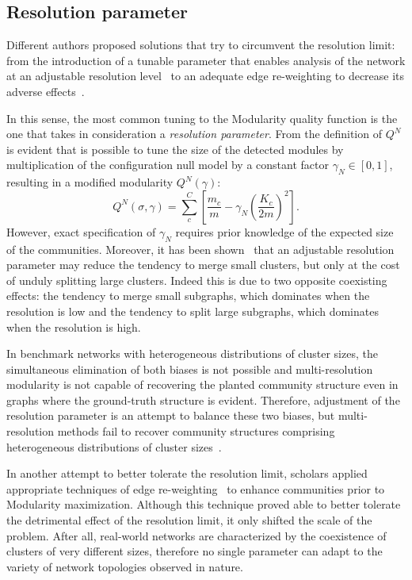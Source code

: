 \subsection{Resolution parameter}\label{sec:resolution_parameter}
Different authors proposed solutions that try to circumvent the resolution limit: from the introduction of a tunable parameter that enables analysis of the network at an adjustable resolution level~\cite{reichardt2006,ronhovde2010,yeo2011} to an adequate edge re-weighting to decrease its adverse effects~\cite{berry2011}.

In this sense, the most common tuning to the Modularity quality function is the one that takes in consideration a \emph{resolution parameter}.
From the definition of $Q^N$ is evident that is possible to tune the size of the detected modules by multiplication of the configuration null model by a constant factor $\gamma_{N} \in [0,1]$, resulting in a modified modularity $Q^N(\gamma)$:
\begin{equation}
Q^N(\sigma,\gamma) = \sum_c^C \left[ \frac{m_c}{m} - \gamma_{N} \left( \frac{K_c}{2m}\right)^2 \right].
\end{equation}
However, exact specification of $\gamma_{N}$ requires prior knowledge of the expected size of the communities.
Moreover, it has been shown~\cite{lancichinetti2011} that an adjustable resolution parameter may reduce the tendency to merge small clusters, but only at the cost of unduly splitting large clusters. 
Indeed this is due to two opposite coexisting effects: the tendency to merge small subgraphs, which dominates when the resolution is low and the tendency to split large subgraphs, which dominates when the resolution is high.

In benchmark networks with heterogeneous distributions of cluster sizes, the simultaneous elimination of both biases is not possible and multi-resolution modularity is not capable of recovering the planted community structure even in graphs where the ground-truth structure is evident.
Therefore, adjustment of the resolution parameter is an attempt to balance these two biases, but multi-resolution methods fail to recover community structures comprising heterogeneous distributions of cluster sizes~\cite{lancichinetti2011}. 

In another attempt to better tolerate the resolution limit, scholars applied appropriate techniques of edge re-weighting~\cite{berry2011} to enhance communities prior to Modularity maximization.
Although this technique proved able to better tolerate the detrimental effect of the resolution limit, it only shifted the scale of the problem.
After all, real-world networks are characterized by the coexistence of clusters of very different sizes, therefore no single parameter can adapt to the variety of network topologies observed in nature.

